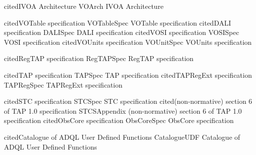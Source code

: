 %
%
%

\def\definestandard#1#2#3{%
  \expandafter\def\csname#1\endcsname{%
    \expandafter\ifx\csname#1cited\endcsname\relax #3 \citep{#2}%
    \expandafter\def\csname#1cited\endcsname{#1}%
      \else #3\fi}}

\definestandard{VOArch}       {2010ivoa.rept.1123A} {IVOA Architecture}

\definestandard{VOTableSpec}  {2013ivoa.spec.0920O} {VOTable specification}
\definestandard{DALISpec}     {2017ivoa.spec.0517D} {DALI specification}
\definestandard{VOSISpec}     {2017ivoa.spec.0524G} {VOSI specification}
\definestandard{VOUnitSpec}   {2014ivoa.spec.0523D} {VOUnits specification}

\definestandard{RegTAPSpec}   {2014ivoa.spec.1208D} {RegTAP specification}

\definestandard{TAPSpec}      {2019ivoa.spec.0927D} {TAP specification}
\definestandard{TAPRegSpec}   {2012ivoa.spec.0827D} {TAPRegExt specification}

\definestandard{STCSpec}      {2007ivoa.spec.1030R} {STC specification}
\definestandard{STCSAppendix} {2010ivoa.spec.0327D} {(non-normative) section 6 of TAP 1.0 specification}
\definestandard{ObsCoreSpec}  {2017ivoa.spec.0509L} {ObsCore specification}

\definestandard{CatalogueUDF} {2021ivoa.spec.0310C} {Catalogue of ADQL User Defined Functions}

%
\newcommand{\FigureRef}[1]{Figure \ref{#1}}
\newcommand{\SectionRef}[1]{Section \ref{#1}}
\newcommand{\SectionSee}[1]{(see Section \ref{#1})}
\newcommand{\AppendixRef}[1]{Appendix \ref{#1}}
